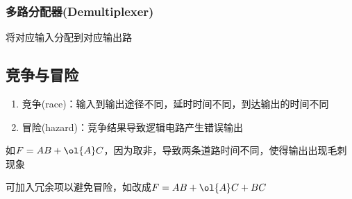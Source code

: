 \subsubsection{多路分配器(Demultiplexer)}
将对应输入分配到对应输出路

\subsection{竞争与冒险}
\begin{enumerate}
	\item 竞争(race)：输入到输出途径不同，延时时间不同，到达输出的时间不同
	\item 冒险(hazard)：竞争结果导致逻辑电路产生错误输出
\end{enumerate}
\par 如$F=AB+\ol{A}C$，因为取非，导致两条道路时间不同，使得输出出现毛刺现象
\par 可加入冗余项以避免冒险，如改成$F=AB+\ol{A}C+BC$